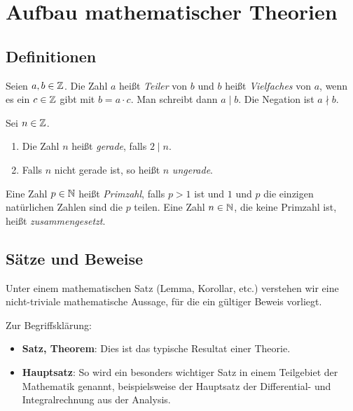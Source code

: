 \section{Aufbau mathematischer Theorien}

\subsection{Definitionen}

\begin{frame}
\begin{mydef}
Seien $a,b \in \mathbb{Z}$.
Die Zahl $a$ heißt \textit{Teiler} von $b$ und $b$ heißt \textit{Vielfaches}
von $a$, wenn es ein $c \in \mathbb{Z}$ gibt mit $b = a \cdot c$.
Man schreibt dann $a \mid b$. Die Negation ist $a \nmid b$.
\end{mydef}

\begin{mydef}
Sei $n \in \mathbb{Z}$.
\begin{enumerate}
\item Die Zahl $n$ heißt \textit{gerade}, falls $2 \mid n$.
\item Falls $n$ nicht gerade ist, so heißt $n$ \textit{ungerade}.
\end{enumerate}
\end{mydef}

\begin{mydef}
Eine Zahl $p \in \mathbb{N}$ heißt \textit{Primzahl}, falls $p > 1$ ist und $1$ und
$p$ die einzigen natürlichen Zahlen sind die $p$ teilen.
Eine Zahl $n \in \mathbb{N}$, die keine Primzahl ist, heißt \textit{zusammengesetzt}.
\end{mydef}
\end{frame}

\subsection{Sätze und Beweise}

\begin{frame}
Unter einem mathematischen Satz (Lemma, Korollar, etc.) verstehen wir eine
nicht-triviale mathematische Aussage, für die ein gültiger Beweis vorliegt.

\begin{remark}
Zur Begriffsklärung:

\begin{itemize}
\item \textbf{Satz, Theorem}: Dies ist das typische Resultat einer Theorie.

\item \textbf{Hauptsatz}:
So wird ein besonders wichtiger Satz in einem Teilgebiet der Mathematik
genannt, beispielsweise der Hauptsatz der Differential- und Integralrechnung
aus der Analysis.
\end{itemize}
\end{remark}
\end{frame}


